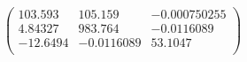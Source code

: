 \documentclass{article}
\begin{document}
\[\left(
\begin{array}{ccc}
 103.593 & 105.159 & -0.000750255 \\
 4.84327 & 983.764 & -0.0116089 \\
 -12.6494 & -0.0116089 & 53.1047 \\
\end{array}
\right)\]
\end{document}
